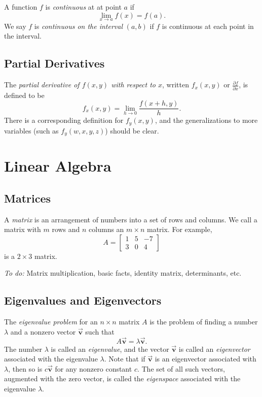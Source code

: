 \documentclass[reqno]{immbook}
\newcommand{\BV}{\vec{\textbf{v}}}
\numberwithin{equation}{chapter}
\numberwithin{question}{section}
\numberwithin{theorem}{chapter}
\numberwithin{figure}{chapter}
\theoremstyle{definition}
\begin{document}
A function $f$ is \emph{continuous} at at point $a$ if
\[
  \lim_{x\rightarrow a} f(x) = f(a).
\]
%
We say $f$ is \emph{continuous on the interval} $(a,b)$ if
$f$ is continuous at each point in the interval.
%
\section{Partial Derivatives}
\label{sec:PartialDerivs}
The \emph{partial derivative of $f(x,y)$ with respect to $x$},
written $f_x(x,y)$ or $\frac{\partial f}{\partial x}$, is
defined to be
\[
   f_x(x,y) = \lim_{h\rightarrow 0} \frac{f(x+h,y)}{h}.
\]
There is a corresponding definition for $f_y(x,y)$,
and the generalizations to more variables
(such as $f_y(w,x,y,z)$) should be clear.
%
%
\chapter{Linear Algebra}
%
\section{Matrices}
A \emph{matrix} is an arrangement of numbers into
a set of rows and columns.  We call a matrix with
$m$ rows and $n$ columns an $m\times n$ matrix.
For example,
\[
   A = \begin{bmatrix}
           1 & 5 & -7 \\ 3 & 0 & 4
       \end{bmatrix}
\]
is a $2\times 3$ matrix.
%

\medskip
\noindent
\emph{To do:} Matrix multiplication, basic facts, identity matrix,
determinants, etc.
%
\section{Eigenvalues and Eigenvectors}
%
The \emph{eigenvalue problem}
for an $n \times n$ matrix $A$
is the problem of finding a number $\lambda$ and a nonzero vector $\BV$
such that
\begin{equation}
    A\BV = \lambda \BV.
    \label{eqn:EIGVALPROB}
\end{equation}
The number $\lambda$ is called an \emph{eigenvalue}, 
and the vector $\BV$ is called an \emph{eigenvector}
associated with the eigenvalue $\lambda$.
Note that if $\BV$ is an eigenvector associated with
$\lambda$, then so is $c\BV$ for any nonzero constant
$c$.
The set of all such vectors, augmented with the zero
vector, is called the \emph{eigenspace}
associated with the eigenvalue $\lambda$.
\end{document}
